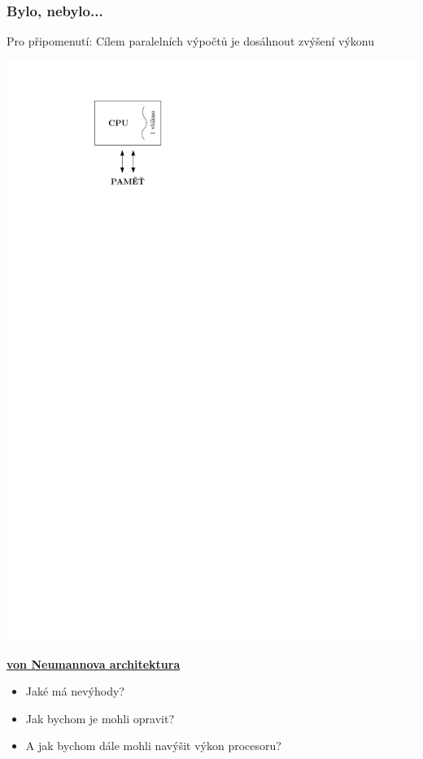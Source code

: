 \documentclass[usenames,dvipsnames,9pt]{beamer}
\newcommand{\see}[1]{\faEye\hspace{5pt}#1}
\begin{document}
\begin{frame}
  \frametitle{Bylo, nebylo...}
  Pro připomenutí: Cílem paralelních výpočtů je dosáhnout zvýšení výkonu
  \vfill
  \begin{minipage}{0.3\linewidth}
    \centering\includegraphics[width=0.7\linewidth]{01/figs/single_thread.pdf}
  \end{minipage}
  \hfill
  \begin{minipage}{0.6\linewidth}
    \textbf{\underline{von Neumannova architektura}}
    \begin{itemize}
      \item Jaké má nevýhody?
      \item Jak bychom je mohli opravit?
      \item A jak bychom dále mohli navýšit výkon procesoru?
    \end{itemize}
    \vspace{1em}
    \see{{\tt 1memory.cpp}}
  \end{minipage}

  \vspace{3em}
\end{frame}
\end{document}
